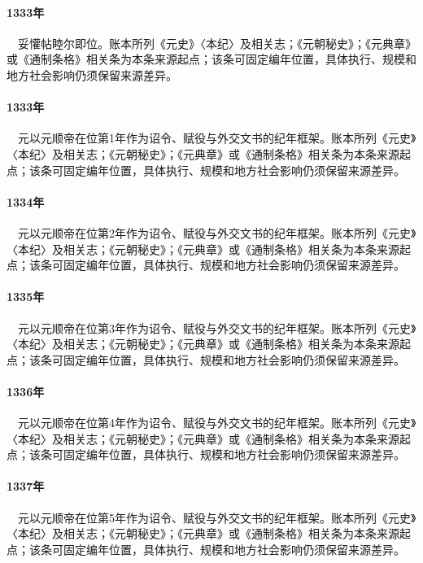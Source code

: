 \paragraph{1333年}　妥懽帖睦尔即位。账本所列《元史》〈本纪〉及相关志；《元朝秘史》；《元典章》或《通制条格》相关条为本条来源起点；该条可固定编年位置，具体执行、规模和地方社会影响仍须保留来源差异。

\paragraph{1333年}　元以元顺帝在位第1年作为诏令、赋役与外交文书的纪年框架。账本所列《元史》〈本纪〉及相关志；《元朝秘史》；《元典章》或《通制条格》相关条为本条来源起点；该条可固定编年位置，具体执行、规模和地方社会影响仍须保留来源差异。

\paragraph{1334年}　元以元顺帝在位第2年作为诏令、赋役与外交文书的纪年框架。账本所列《元史》〈本纪〉及相关志；《元朝秘史》；《元典章》或《通制条格》相关条为本条来源起点；该条可固定编年位置，具体执行、规模和地方社会影响仍须保留来源差异。

\paragraph{1335年}　元以元顺帝在位第3年作为诏令、赋役与外交文书的纪年框架。账本所列《元史》〈本纪〉及相关志；《元朝秘史》；《元典章》或《通制条格》相关条为本条来源起点；该条可固定编年位置，具体执行、规模和地方社会影响仍须保留来源差异。

\paragraph{1336年}　元以元顺帝在位第4年作为诏令、赋役与外交文书的纪年框架。账本所列《元史》〈本纪〉及相关志；《元朝秘史》；《元典章》或《通制条格》相关条为本条来源起点；该条可固定编年位置，具体执行、规模和地方社会影响仍须保留来源差异。

\paragraph{1337年}　元以元顺帝在位第5年作为诏令、赋役与外交文书的纪年框架。账本所列《元史》〈本纪〉及相关志；《元朝秘史》；《元典章》或《通制条格》相关条为本条来源起点；该条可固定编年位置，具体执行、规模和地方社会影响仍须保留来源差异。


